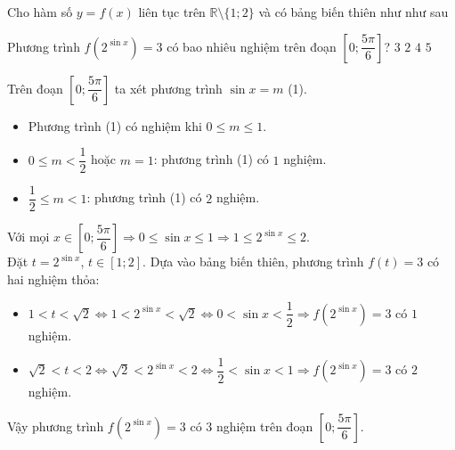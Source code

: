 \begin{ex}%
	Cho hàm số $y=f(x)$ liên tục trên $\mathbb{R}\setminus \{1;2\}$ và có bảng biến thiên như như sau
	\begin{center}
	\end{center}
	Phương trình $f(2^{\sin x})=3$ có bao nhiêu nghiệm trên đoạn $\left[0;\dfrac{5\pi}{6}\right]$?
	\choice
	{\True $3$}
	{$2$}
	{$4$}
	{$5$}
	\loigiai
	{
		Trên đoạn $\left[0;\dfrac{5\pi}{6}\right]$ ta xét phương trình $\sin x=m$ (1).
		\begin{itemize}
			\item Phương trình (1) có nghiệm khi $0\le m\le1$.
			\item $0\le m<\dfrac{1}{2}$ hoặc $m=1$: phương trình (1) có $1$ nghiệm.
			\item $\dfrac{1}{2}\le m <1$: phương trình (1) có $2$ nghiệm.
		\end{itemize}
	 Với mọi $x \in \left[0;\dfrac{5\pi}{6}\right] \Rightarrow 0\le \sin x\le1 \Rightarrow 1\le2^{\sin x}\le2$. \\
	 Đặt $t=2^{\sin x}$, $t \in [1;2]$.
	 Dựa vào bảng biến thiên, phương trình $f(t)=3$ có hai nghiệm thỏa:
	 \begin{itemize}
	 	\item $1<t<\sqrt{2}\Leftrightarrow1<2^{\sin x}<\sqrt{2} \Leftrightarrow 0<\sin x<\dfrac{1}{2} \Rightarrow f(2^{\sin x})=3$ có $1$ nghiệm.
	 	\item $\sqrt{2}<t<2\Leftrightarrow\sqrt{2}<2^{\sin x}<2 \Leftrightarrow \dfrac{1}{2}<\sin x<1 \Rightarrow f(2^{\sin x})=3$ có $2$ nghiệm.
	 \end{itemize}
 Vậy phương trình $f(2^{\sin x})=3$ có $3$ nghiệm trên đoạn $\left[0;\dfrac{5\pi}{6}\right]$.
 	}
\end{ex}

